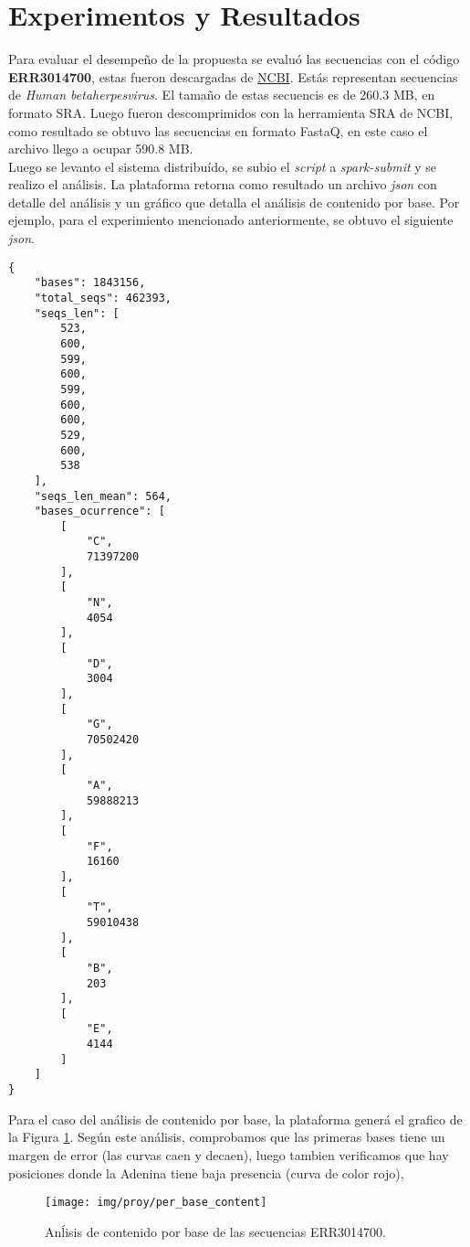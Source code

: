 
\section{Experimentos y Resultados}

Para evaluar el desempeño de la propuesta se evaluó las secuencias con el código \textbf{ERR3014700}, estas fueron descargadas de \href{https://www.ncbi.nlm.nih.gov/sra/ERR3014700}{NCBI}. Estás representan secuencias de \textit{Human betaherpesvirus}. El tamaño de estas secuencis es de 260.3 MB, en formato SRA. Luego fueron descomprimidos con la herramienta SRA de NCBI, como resultado se obtuvo las secuencias en formato FastaQ, en este caso el archivo llego a ocupar 590.8 MB. \\

Luego se levanto el sistema distribuído, se subio el \textit{script} a \textit{spark-submit} y se realizo el análisis. La plataforma retorna como resultado un archivo \textit{json} con detalle del análisis y un gráfico que detalla el análisis de contenido por base. Por ejemplo, para el experimiento mencionado anteriormente, se obtuvo el siguiente \textit{json}. \\

\begin{lstlisting}
{
	"bases": 1843156,
	"total_seqs": 462393,
	"seqs_len": [
		523,
		600,
		599,
		600,
		599,
		600,
		600,
		529,
		600,
		538
	],
	"seqs_len_mean": 564,
	"bases_ocurrence": [
		[
			"C",
			71397200
		],
		[
			"N",
			4054
		],
		[
			"D",
			3004
		],
		[
			"G",
			70502420
		],
		[
			"A",
			59888213
		],
		[
			"F",
			16160
		],
		[
			"T",
			59010438
		],
		[
			"B",
			203
		],
		[
			"E",
			4144
		]
	]
}
\end{lstlisting}


Para el caso del análisis de contenido por base, la plataforma generá el grafico de la Figura 	\ref{fig:analysis2}. Según este análisis, comprobamos que las primeras bases tiene un margen de error (las curvas caen y decaen), luego tambien verificamos que hay posiciones donde la Adenina tiene baja presencia (curva de color rojo),

\begin{figure}[H]
	\centering
	\texttt{[image: img/proy/per\_base\_content]}
	\caption{Anĺisis de contenido por base de las secuencias ERR3014700.}
	\label{fig:analysis2}
\end{figure}
